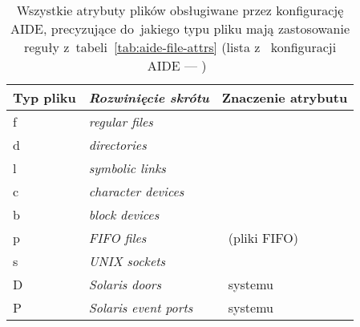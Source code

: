 \documentclass[thesis]{subfiles}
\begin{document}
\begin{table}
	\centering
	\footnotesize
	\begin{tabular}{>{\ttfamily}l|>{\itshape}l|l}
		\textnormal{Typ pliku} & \textnormal{Rozwinięcie skrótu} & Znaczenie atrybutu                     \\\hline\hline
		f                      & regular files                   & \regularfilewiki                       \\\hline
		d                      & directories                     & \directorywiki                         \\\hline
		l                      & symbolic links                  & \symlinkwiki                           \\\hline
		c                      & character devices               & \chardevwiki                           \\\hline
		b                      & block devices                   & \blockdevwiki                          \\\hline
		p                      & FIFO files                      & \fifofilewiki~(pliki FIFO)             \\\hline
		s                      & UNIX sockets                    & \unixsocketwiki                        \\\hline
		D                      & Solaris doors                   & \solarisdoorwiki~systemu \solariswiki  \\\hline
		P                      & Solaris event ports             & \solariseventport~systemu \solariswiki
	\end{tabular}
	\caption[Wszystkie atrybuty plików obsługiwane przez konfigurację AIDE, precyzujące do~jakiego typu pliku mają zastosowanie reguły z~tabeli~\ref{tab:aide-file-attrs}]{Wszystkie atrybuty plików obsługiwane przez konfigurację AIDE, precyzujące do~jakiego typu pliku mają zastosowanie reguły z~tabeli~\ref{tab:aide-file-attrs} (lista z~\emph{} konfiguracji AIDE --- )~\cite{aide-manual}}
	\label{tab:aide-file-types}
\end{table}
\end{document}
